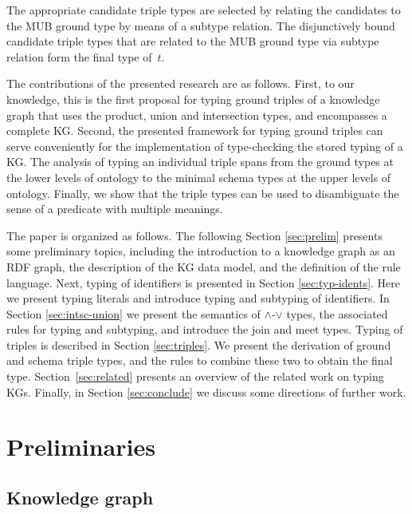 \documentclass[runningheads]{llncs}
\begin{document}
The appropriate candidate triple types are selected by relating the
candidates to the MUB ground type by means of a subtype relation. The
disjunctively bound candidate triple types that are related to the MUB
ground type via subtype relation form the final type of~$t$.


The contributions of the presented research are as follows. First, to
our knowledge, this is the first proposal for typing ground triples of
a knowledge graph that uses the product, union and intersection types,
and encompasses a complete KG. Second, the presented framework for
typing ground triples can serve conveniently for the implementation of
type-checking the stored typing of a KG. The analysis of typing an
individual triple spans from the ground types at the lower levels of
ontology to the minimal schema types at the upper levels of
ontology. Finally, we show that the triple types can be used to
disambiguate the sense of a predicate with multiple meanings.

The paper is organized as follows. The following Section
\ref{sec:prelim} presents some preliminary topics, including the
introduction to a knowledge graph as an RDF graph, the description of
the KG data model, and the definition of the rule language. Next,
typing of identifiers is presented in Section
\ref{sec:typ-idents}. Here we present typing literals and introduce
typing and subtyping of identifiers. In Section \ref{sec:intsc-union}
we present the semantics of $\land$-$\lor$ types, the associated rules
for typing and subtyping, and introduce the join and meet
types. Typing of triples is described in Section \ref{sec:triples}. We
present the derivation of ground and schema triple types, and the
rules to combine these two to obtain the final
type. Section~\ref{sec:related} presents an overview of the related
work on typing KGs. Finally, in Section \ref{sec:conclude} we discuss
some directions of further work.






\section{Preliminaries\label{sec:prelim}}


\subsection{Knowledge graph\label{sec:kg}}
\end{document}
